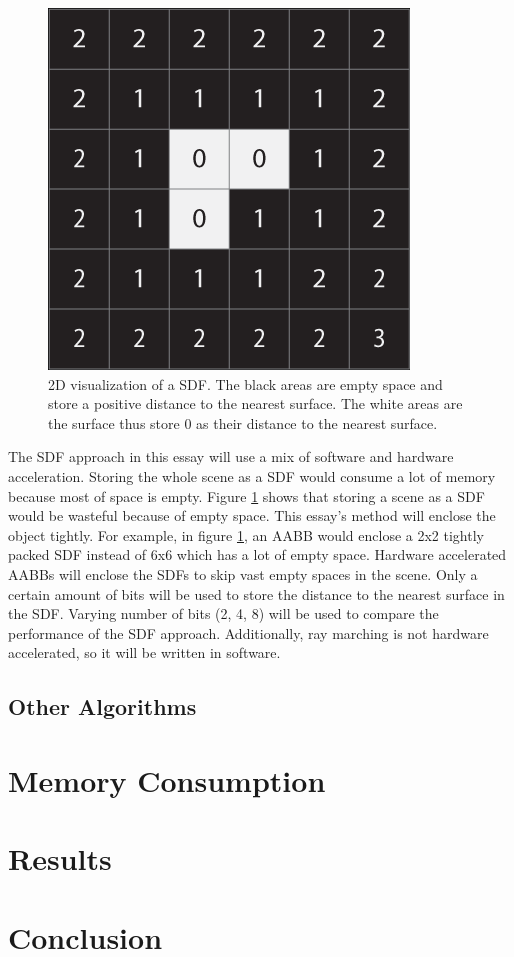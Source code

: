 \documentclass[12pt]{article}
\begin{document}
\begin{figure}[h]
    \begin{center}
        \includegraphics[scale=0.22]{Voxel-SDF}
    \end{center}
    \caption{
        2D visualization of a SDF. The black areas are empty space and store a positive distance to the nearest surface.
        The white areas are the surface thus store 0 as their distance to the nearest surface.
        \parencite{ByteWrangler:Voxel-SDF}}
    \label{fig:Voxel-SDF}
\end{figure}

The SDF approach in this essay will use a mix of software and hardware acceleration.
Storing the whole scene as a SDF would consume a lot of memory because most of space is empty.
Figure \ref{fig:Voxel-SDF} shows that storing a scene as a SDF would be wasteful because of empty space.
This essay's method will enclose the object tightly. For example, in figure \ref{fig:Voxel-SDF}, an AABB would enclose a 2x2 tightly packed SDF instead of 6x6 which has a lot of empty space.
Hardware accelerated AABBs will enclose the SDFs to skip vast empty spaces in the scene.
Only a certain amount of bits will be used to store the distance to the nearest surface in the SDF.
Varying number of bits (2, 4, 8) will be used to compare the performance of the SDF approach.
Additionally, ray marching is not hardware accelerated, so it will be written in software.

\subsection{Other Algorithms}

\section{Memory Consumption}

\section{Results}

\section{Conclusion}

\printbibliography
\end{document}
